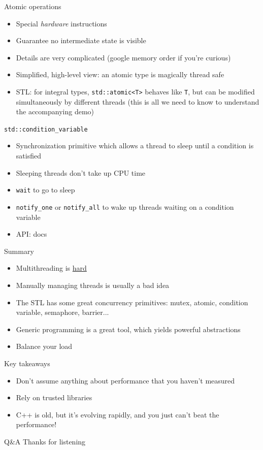 \documentclass{beamer}
\begin{document}
\begin{frame}{Atomic operations}
\begin{itemize}
\item Special \textit{hardware} instructions
\item Guarantee no intermediate state is visible
\item Details are very complicated (google memory order if you're curious)
\item Simplified, high-level view: an atomic type is magically thread safe
\item STL: for integral types, \texttt{std::atomic<T>} behaves like \texttt{T}, but can be modified simultaneously by different threads (this is all we need to know to understand the accompanying demo)
\end{itemize}
\end{frame}

\begin{frame}{\texttt{std::condition\_variable}}
\begin{itemize}
\item Synchronization primitive which allows a thread to sleep until a condition is satisfied
\item Sleeping threads don't take up CPU time
\item \texttt{wait} to go to sleep
\item \texttt{notify\_one} or \texttt{notify\_all} to wake up threads waiting on a condition variable
\item API: docs
\end{itemize}
\end{frame}

\begin{frame}{Summary}
\begin{itemize}
\setlength\itemsep{.5em}
\item Multithreading is \underline{hard}
\item Manually managing threads is usually a bad idea
\item The STL has some great concurrency primitives: mutex, atomic, condition variable, semaphore, barrier...
\item Generic programming is a great tool, which yields powerful abstractions
\item Balance your load
\end{itemize}
\end{frame}

\begin{frame}{Key takeaways}
\Large
\begin{itemize}
\setlength\itemsep{1em}
\item[\rightarrow] Don't assume anything about performance that you haven't measured
\item[\rightarrow] Rely on trusted libraries
\item[\rightarrow] C++ is old, but it's evolving rapidly, and you just can't beat the performance!
\end{itemize}
\end{frame}

\appendix
\begin{frame}{Q\&A}
\LARGE
Thanks for listening
\end{frame}
\end{document}
